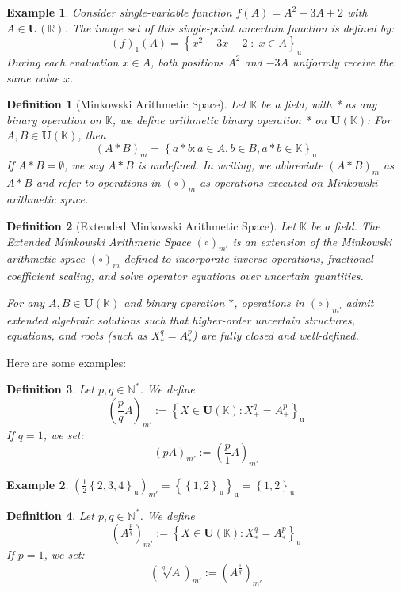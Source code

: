\documentclass[a4paper,12pt, twoside]{memoir}
\newtheorem{definition}{Definition}[chapter]
\newtheorem{example}{Example}[chapter]
\newcommand{\set}[1]{\left\{#1\right\}} %
\newcommand{\s}[1]{\set{#1}_\mathrm{u}} %
\newcommand{\tsbd}[1]{\mathbf{U}(\mathbb{#1})}
\newcommand{\kgdd}[1]{\left(#1\right)_1} %
\newcommand{\kgdtmr}[1]{\left(#1\right)_{m'}} %
\begin{document}
\begin{example}
	Consider single-variable function $f(A) = A^2 - 3A + 2$ with $A \in \tsbd{\mathbb{R}}$. The image set of this single-point uncertain function is defined by:
	\[
		\kgdd{f}(A) = \s{x^2 - 3x + 2 \;:\; x \in A}
	\]
	During each evaluation $x \in A$, both positions $A^2$ and $-3A$ uniformly receive the same value $x$.
\end{example}

\begin{definition}[Minkowski Arithmetic Space]
	Let $\mathbb{K}$ be a field, with * as any binary operation on $\mathbb{K}$, we define arithmetic binary operation * on $\tsbd{K}$:
	For $A,B \in \tsbd{K}$, then
	$$(A * B)_m = \s{a*b : a \in A , b\in B , a*b \in \mathbb{K}}$$
	If $A * B =\emptyset$, we say $A * B$ is undefined. In writing, we abbreviate $(A*B)_m$ as $A*B$ and refer to operations in $(\circ)_m$ as operations executed on Minkowski arithmetic space.
\end{definition}

\begin{definition}[Extended Minkowski Arithmetic Space]
	Let $\mathbb{K}$ be a field. The Extended Minkowski Arithmetic Space $(\circ)_{m'}$ is an extension of the Minkowski arithmetic space $(\circ)_m$ defined to incorporate inverse operations, fractional coefficient scaling, and solve operator equations over uncertain quantities.

	For any $A, B \in \tsbd{K}$ and binary operation $*$, operations in $(\circ)_{m'}$ admit extended algebraic solutions such that higher-order uncertain structures, equations, and roots (such as $X^q_* = A^p_*$) are fully closed and well-defined.
\end{definition}

Here are some examples:

\begin{definition}
	Let $p,q \in \mathbb{N}^*$.
	We define \[\kgdtmr{\frac{p}{q}A} := \s{X \in \tsbd{K}: X^q_+ = A^p_+} \]
	If $q = 1$, we set: \[\kgdtmr{pA}:= \kgdtmr{\frac{p}{1} A} \]
\end{definition}

\begin{example}
	$\kgdtmr{\frac{1}{2} \s{2,3,4}} = \s{\s{1,2}} = \s{1,2}$
\end{example}

\begin{definition}
	Let $p,q \in \mathbb{N^*}$.
	We define \[\kgdtmr{A^{\frac{p}{q}}} := \s{X \in \tsbd{K}: X^q_* = A^p_*} \]
	If $p = 1$, we set: \[\kgdtmr{\sqrt[q]{A}} := \kgdtmr{A^{\frac{1}{q}}}\]
\end{definition}
\end{document}

